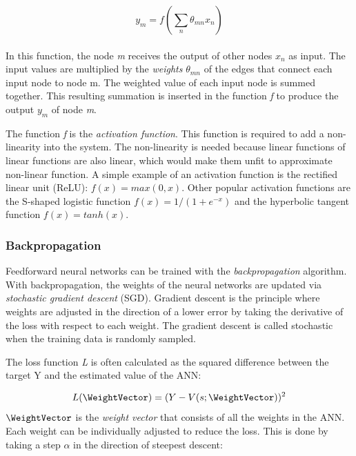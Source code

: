 \begin{equation}
    y_m = f( \underset{n}{\sum} \theta_{mn} x_n )
\end{equation}
\\[-2mm] \noindent
In this function, the node \textit{m} receives the output of other nodes $x_n$ as input. The input values are multiplied by the \textit{weights} $\theta_{mn}$ of the edges that connect each input node to node m. The weighted value of each input node is summed together. This resulting summation is inserted in the function \textit{f} to produce the output $y_m$ of node \textit{m}. 

The function \textit{f} is the \textit{activation function}. This function is required to add a non-linearity into the system. The non-linearity is needed because linear functions of linear functions are also linear, which would make them unfit to approximate non-linear function. A simple example of an activation function is the rectified linear unit (ReLU): $f(x) = max(0,x)$. Other popular activation functions are the S-shaped logistic function $f(x) = 1/(1+e^{-x})$ and the hyperbolic tangent function $f(x) = tanh(x)$. 









\subsubsection*{Backpropagation}


Feedforward neural networks can be trained with the \textit{backpropagation} algorithm. With backpropagation, the weights of the neural networks are updated via \textit{stochastic gradient descent} (SGD). Gradient descent is the principle where weights are adjusted in the direction of a lower error by taking the derivative of the loss with respect to each weight. The gradient descent is called stochastic when the training data is randomly sampled. 

The loss function \textit{L} is often calculated as the squared difference between the target Y and the estimated value of the ANN:

\begin{equation}
    L(\WeightVector) = (Y - V(s;\WeightVector))^2
\end{equation}
$\WeightVector$ is the \textit{weight vector} that consists of all the weights in the ANN. Each weight can be individually adjusted to reduce the loss. This is done by taking a step $\alpha$ in the direction of steepest descent:

